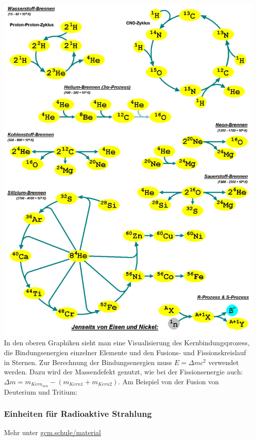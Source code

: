\documentclass{article}
\begin{document}
	    		\includegraphics[width=1\textwidth]{graphics/sternzyklus.png} \\
	    		In den oberen Graphiken sieht man eine Visualisierung des Kernbindungsprozess, die Bindungsenergien einzelner Elemente und
	    		den Fusions- und Fissionskreislauf in Sternen. Zur Berechnung der Bindungsenergien muss $ E=\Delta mc^2 $ verwendet werden.
	    		Dazu wird der Massendefekt genutzt, wie bei der Fissionsenergie auch: $\Delta m = m_{Kern_{neu}} - (m_{Kern1} + m_{Kern2})$.
	    		Am Beispiel von der Fusion von Deuterium und Tritium: 
	    		
	    	\subsubsection{Einheiten für Radioaktive Strahlung}
	    		
	    		Mehr unter \href{https://gcm.schule/material/2024/physik/lk13/q4_wopla-05.md}{gcm.schule/material}
	    		
\end{document}
